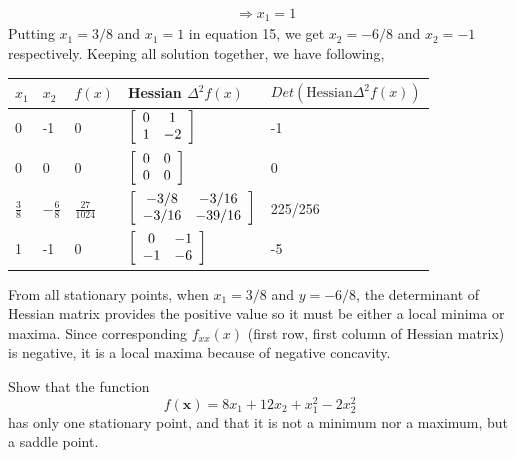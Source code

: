 \documentclass[a4paper,10pt]{article}
\begin{document}
\begin{enumerate}
\begin{equation}
\begin{split}
          & \Rightarrow x_1 = 1
        \end{split}
    \end{equation}
    Putting $x_1=3/8$ and $x_1=1$ in equation 15, we get $x_2=-6/8$ and $x_2=-1$ respectively. Keeping all solution together, we have following,
    \begin{center}
    \begin{tabular}{ | m{1em} | m{1em} | m{1cm} |  m{10em} | m{10em} | } 
      \hline
      $x_1$ & $x_2$ & $f(x)$ & Hessian $\Delta^2f(x)$ & $Det(\text{Hessian} \Delta^2f(x))$ \\ 
      \hline
      0 & -1 & 0 & $\left[\begin{array}{c c} 0  &1 \\ 1 &-2 \end{array} \right]$ & -1 \\ 
      \hline
      0 & 0 & 0 & $\left[\begin{array}{c c} 0  &0 \\ 0 &0 \end{array} \right]$ & 0 \\ 
      \hline
      $\frac{3}{8}$ &  $-\frac{6}{8}$ & $\frac{27}{1024}$ & $\left[\begin{array}{c c} -3/8  &-3/16 \\ -3/16 &-39/16 \end{array} \right]$ & 225/256 \\ 
      \hline
      1 & -1 & 0 & $\left[\begin{array}{c c} 0  &-1 \\ -1 &-6 \end{array} \right]$ & -5\\ 
      \hline
    \end{tabular}
    \end{center}
    From all stationary points, when $x_1 = 3/8$ and $y= -6/8$, the determinant of Hessian matrix provides the positive value so it must be either a local minima or maxima. Since corresponding $f_{xx}(x)$ (first row, first column of Hessian matrix) is negative, it is a local maxima because of negative concavity.
    \\
    \begin{taskbox}
    Show that the function 
    \begin{equation}
        f(\mathbf{x}) = 8x_1 + 12x_2 + x_1^2 - 2x^2_2
    \end{equation}
    has only one stationary point, and that it is not a minimum nor a maximum, but a saddle point.

\end{taskbox}
\end{enumerate}
\end{document}
